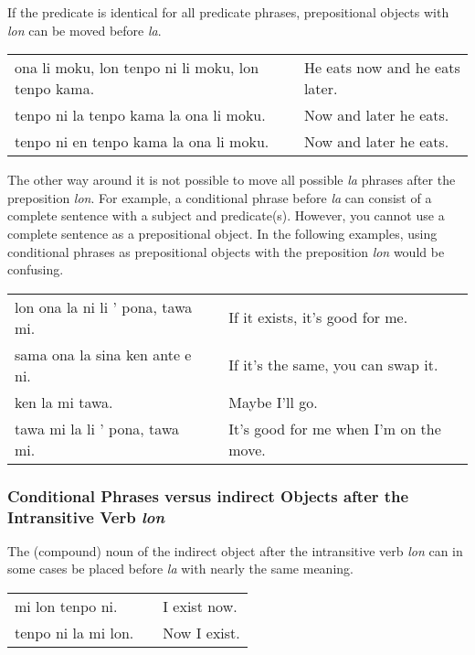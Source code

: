 If the predicate is identical for all predicate phrases, prepositional objects with \textit{lon} can be moved before \textit{la}.

\begin{supertabular}{p{5,5cm}|ll}
    ona li moku, lon tenpo ni li moku, lon tenpo kama. &  & He eats now and he eats later. \\
    tenpo ni la tenpo kama la ona li moku.             &  & Now and later he eats.         \\
    tenpo ni en tenpo kama la ona li moku.             &  & Now and later he eats.         \\
\end{supertabular}

The other way around it is not possible to move all possible \textit{la} phrases after the preposition \textit{lon}.
For example, a conditional phrase before \textit{la} can consist of a complete sentence with a subject and predicate(s).
However, you cannot use a complete sentence as a prepositional object.
In the following examples, using conditional phrases as prepositional objects with the preposition \textit{lon} would be confusing.

\begin{supertabular}{p{5,5cm}|ll}
    lon ona la ni li ' pona, tawa mi. &  & If it exists, it's good for me.        \\
    sama ona la sina ken ante e ni.   &  & If it's the same, you can swap it.     \\
    ken la mi tawa.                   &  & Maybe I'll go.                         \\
    tawa mi la li ' pona, tawa mi.    &  & It's good for me when I'm on the move. \\
\end{supertabular}

\subsubsection*{Conditional Phrases versus indirect Objects after the Intransitive Verb \textit{lon} }
The (compound) noun of the indirect object after the intransitive verb \textit{lon} can in some cases be placed before \textit{la} with nearly the same meaning.

\begin{supertabular}{p{5,5cm}|ll}
    mi lon tenpo ni.    &  & I exist now. \\
    tenpo ni la mi lon. &  & Now I exist. \\
\end{supertabular}

